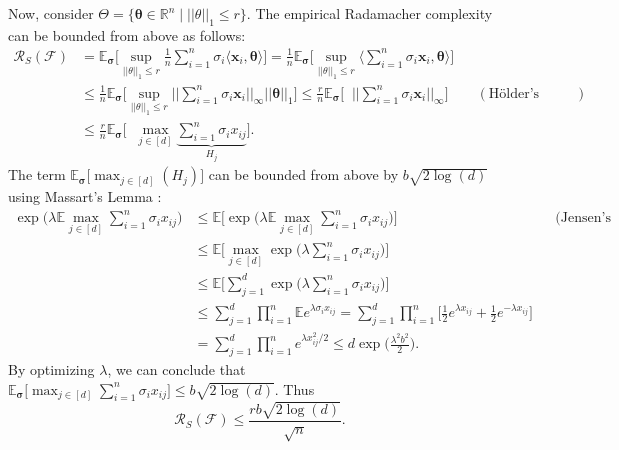 \documentclass[]{article}
\newcommand{\bx}{\mathbf{x}}
\newcommand{\btheta}{{\boldsymbol{\theta}}}
\newcommand{\bsigma}{{\boldsymbol{\sigma}}}
\newcommand{\cF}{\mathcal{F}}
\newcommand{\Rad}{\mathcal{R}}
\newcommand{\R}{\mathbb{R}}
\newcommand{\E}{\mathbb{E}}
\begin{document}
	Now, consider  $\Theta = \{\btheta \in \R^n \;\big|\; ||\theta||_1 \leq r\}$. The empirical Radamacher complexity can be bounded from above as follows:	
	\begin{align*}
	\Rad_S(\cF) &= \E_{\bsigma}\Big[\sup_{||\theta||_1 \leq r} \frac{1}{n}\sum_{i = 1}^{n} \sigma_i \langle \bx_i, \btheta\rangle\Big]
	= \frac{1}{n} \E_{\bsigma} \Big[\sup_{||\theta||_1 \leq r} \Big\langle \sum_{i = 1}^{n} \sigma_i \bx_i, \btheta\Big\rangle\Big]\\		
	&\leq \frac{1}{n} \E_{\bsigma} \Big[\sup_{||\theta||_1 \leq r} \big|\big| \sum_{i = 1}^{n} \sigma_i \bx_i\big|\big|_\infty \big|\big|\btheta\big|\big|_1\Big] 
	\leq \frac{r}{n} \E_{\bsigma} \Big[\;\; \big|\big| \sum_{i = 1}^{n} \sigma_i \bx_i\big|\big|_\infty\Big]	&& (\text{H\"older's Inequality})\\
	&\leq \frac{r}{n} \E_{\bsigma} \Big[\;\; \max_{j\in [d]} \underbrace{\sum_{i = 1}^{n} \sigma_i x_{ij}}_{H_j}\Big].
	\end{align*}
	The term $\E_\bsigma\Big[ \max_{j\in [d]} (H_j)\Big]$ can be bounded from above by $b\sqrt{2\log(d)}$ using Massart's Lemma \cite{mohri}:
	\begin{align*}
	\exp\Big(\lambda \E\max_{j\in [d]} \sum_{i = 1}^n \sigma_i x_{ij}\Big) &\leq \E\Big[\exp\big(\lambda \E\max_{j\in [d]} \sum_{i = 1}^{n} \sigma_i x_{ij}\big)\Big] && \text{(Jensen's Inequality)}\\
	&\leq \E\Big[\max_{j\in [d]} \exp\big(\lambda  \sum_{i = 1}^n \sigma_i x_{ij}\big)\Big]\\
	&\leq \E\Big[\sum_{j = 1}^{d} \exp\big(\lambda  \sum_{i = 1}^n \sigma_i x_{ij}\big)\Big]\\
	&\leq \sum_{j = 1}^{d} \prod_{i = 1}^{n}\E e^{\lambda \sigma_i x_{ij}} =  \sum_{j = 1}^{d} \prod_{i = 1}^{n} \Big[\frac{1}{2} e^{\lambda x_{ij}} + \frac{1}{2} e^{-\lambda x_{ij}}\Big]\\
	&=  \sum_{j = 1}^{d} \prod_{i = 1}^{n} e^{{\lambda x_{ij}^2}/2} \leq d \exp\Big(\frac{\lambda^2 b^2}{2}\Big).
	\end{align*}
	By optimizing $\lambda$, we can conclude that
	$\E_\bsigma \Big[\max_{j\in [d]} \sum_{i = 1}^n \sigma_i x_{ij}\Big] \leq b\sqrt{2\log(d)}$. Thus
	\begin{equation*}
	\Rad_S(\cF) \leq \frac{rb\sqrt{2\log(d)}}{\sqrt{n}}.
	\end{equation*}
	
\end{document}
